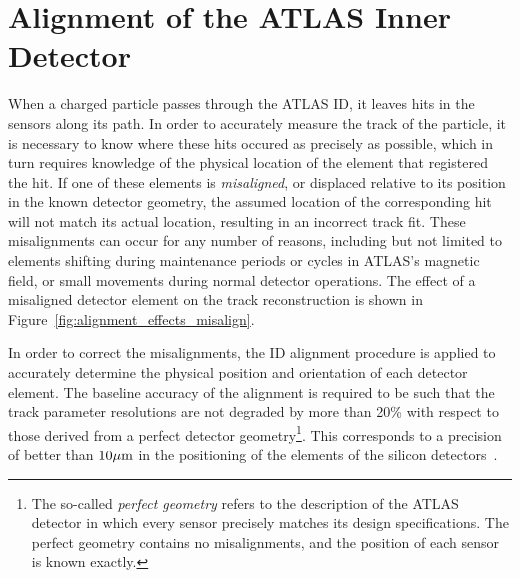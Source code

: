 \chapter[Alignment of the ATLAS Inner Detector][Alignment of the ATLAS Inner Detector]{Alignment of the ATLAS Inner Detector}
\label{ch:alignment}

When a charged particle passes through the ATLAS ID, it leaves hits in the sensors along its path.
In order to accurately measure the track of the particle, it is necessary to know where these hits occured as precisely as possible, which in turn requires knowledge of the physical location of the element that registered the hit.
If one of these elements is \emph{misaligned}, or displaced relative to its position in the known detector geometry, the assumed location of the corresponding hit will not match its actual location, resulting in an incorrect track fit.
These misalignments can occur for any number of reasons, including but not limited to elements shifting during maintenance periods or cycles in ATLAS's magnetic field, or small movements during normal detector operations.
The effect of a misaligned detector element on the track reconstruction is shown in Figure~\ref{fig:alignment_effects_misalign}. %

In order to correct the misalignments, the ID alignment procedure is applied to accurately determine the physical position and orientation of each detector element.
The baseline accuracy of the alignment is required to be such that the track parameter resolutions are not degraded by more than 20\% with respect to those derived from a perfect detector geometry\footnote{The so-called \emph{perfect geometry} refers to the description of the ATLAS detector in which every sensor precisely matches its design specifications.  The perfect geometry contains no misalignments, and the position of each sensor is known exactly.}.
This corresponds to a precision of better than $10\mu\textrm{m}$ in the positioning of the elements of the silicon detectors~\cite{TDR-ID1}.

